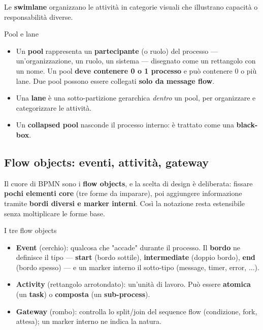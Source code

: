 Le \textbf{swimlane} organizzano le attività in categorie visuali che illustrano capacità o responsabilità diverse.

\begin{boxdefinition}{Pool e lane}
\begin{itemize}
\item Un \textbf{pool} rappresenta un \textbf{partecipante} (o ruolo) del processo — un'organizzazione, un ruolo, un sistema — disegnato come un rettangolo con un nome. Un pool \textbf{deve contenere 0 o 1 processo} e può contenere 0 o più lane. Due pool possono essere collegati \textbf{solo da message flow}.
\item Una \textbf{lane} è una sotto-partizione gerarchica \emph{dentro} un pool, per organizzare e categorizzare le attività.
\item Un \textbf{collapsed pool} nasconde il processo interno: è trattato come una \textbf{black-box}.
\end{itemize}
\end{boxdefinition}

\subsection{\texorpdfstring{Flow objects: eventi, attività, gateway}{Flow objects: eventi, attività, gateway}}

Il cuore di BPMN sono i \textbf{flow objects}, e la scelta di design è deliberata: fissare \textbf{pochi elementi core} (tre forme da imparare), poi aggiungere informazione tramite \textbf{bordi diversi e marker interni}. Così la notazione resta estensibile senza moltiplicare le forme base.

\begin{boxdefinition}{I tre flow objects}
\begin{itemize}
\item \textbf{Event} (cerchio): qualcosa che "accade" durante il processo. Il \textbf{bordo} ne definisce il tipo — \textbf{start} (bordo sottile), \textbf{intermediate} (doppio bordo), \textbf{end} (bordo spesso) — e un marker interno il sotto-tipo (message, timer, error, ...).
\item \textbf{Activity} (rettangolo arrotondato): un'unità di lavoro. Può essere \textbf{atomica} (un \textbf{task}) o \textbf{composta} (un \textbf{sub-process}).
\item \textbf{Gateway} (rombo): controlla lo split/join del sequence flow (condizione, fork, attesa); un marker interno ne indica la natura.
\end{itemize}
\end{boxdefinition}

